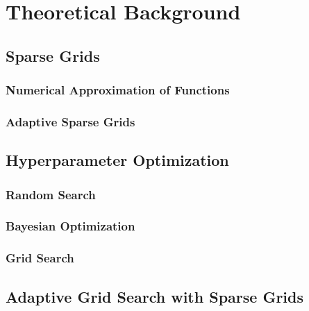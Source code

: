 
\chapter{Theoretical Background}\label{chapter:theoretical_background}


\section{Sparse Grids}

\subsection{Numerical Approximation of Functions}

\subsection{Adaptive Sparse Grids}


\section{Hyperparameter Optimization}

\subsection{Random Search}

\subsection{Bayesian Optimization}

\subsection{Grid Search}


\section{Adaptive Grid Search with Sparse Grids}